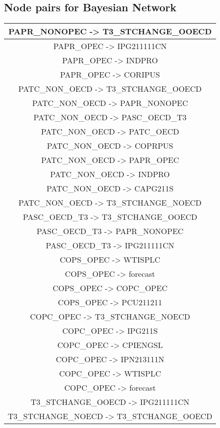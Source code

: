 \subsection*{Node pairs for Bayesian Network}
\begin{table}[h]
    \centering
    \begin{scriptsize}  %
    \begin{tabular}{c}
PAPR_NONOPEC -> T3_STCHANGE_OOECD \\
\hline
PAPR_OPEC -> IPG211111CN \\
\hline
PAPR_OPEC -> INDPRO \\
\hline
PAPR_OPEC -> CORIPUS \\
\hline
PATC_NON_OECD -> T3_STCHANGE_OOECD \\
\hline
PATC_NON_OECD -> PAPR_NONOPEC \\
\hline
PATC_NON_OECD -> PASC_OECD_T3 \\
\hline
PATC_NON_OECD -> PATC_OECD \\
\hline
PATC_NON_OECD -> COPRPUS \\
\hline
PATC_NON_OECD -> PAPR_OPEC \\
\hline
PATC_NON_OECD -> INDPRO \\
\hline
PATC_NON_OECD -> CAPG211S \\
\hline
PATC_NON_OECD -> T3_STCHANGE_NOECD \\
\hline
PASC_OECD_T3 -> T3_STCHANGE_OOECD \\
\hline
PASC_OECD_T3 -> PAPR_NONOPEC \\
\hline
PASC_OECD_T3 -> IPG211111CN \\
\hline
COPS_OPEC -> WTISPLC \\
\hline
COPS_OPEC -> forecast \\
\hline
COPS_OPEC -> COPC_OPEC \\
\hline
COPS_OPEC -> PCU211211 \\
\hline
COPC_OPEC -> T3_STCHANGE_NOECD \\
\hline
COPC_OPEC -> IPG211S \\
\hline
COPC_OPEC -> CPIENGSL \\
\hline
COPC_OPEC -> IPN213111N \\
\hline
COPC_OPEC -> WTISPLC \\
\hline
COPC_OPEC -> forecast \\
\hline
T3_STCHANGE_OOECD -> IPG211111CN \\
\hline
T3_STCHANGE_NOECD -> T3_STCHANGE_OOECD \\

\end{tabular}
\end{scriptsize}
\end{table}
